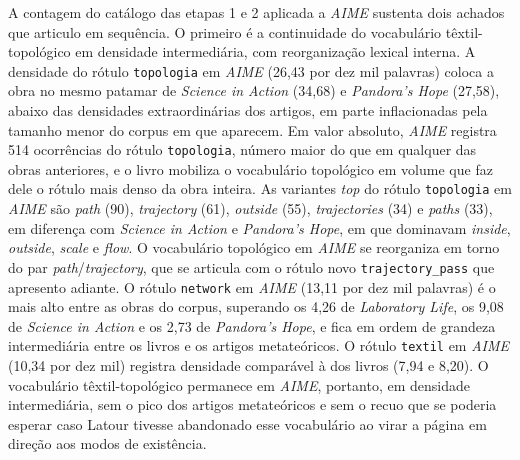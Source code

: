 A contagem do catálogo das etapas 1 e 2 aplicada a \textit{AIME} sustenta dois achados que articulo em sequência. O primeiro é a continuidade do vocabulário têxtil-topológico em densidade intermediária, com reorganização lexical interna. A densidade do rótulo \texttt{topologia} em \textit{AIME} (26,43 por dez mil palavras) coloca a obra no mesmo patamar de \emph{Science in Action} (34,68) e \emph{Pandora's Hope} (27,58), abaixo das densidades extraordinárias dos artigos, em parte inflacionadas pela tamanho menor do corpus em que aparecem. Em valor absoluto, \textit{AIME} registra 514 ocorrências do rótulo \texttt{topologia}, número maior do que em qualquer das obras anteriores, e o livro mobiliza o vocabulário topológico em volume que faz dele o rótulo mais denso da obra inteira. As variantes \emph{top} do rótulo \texttt{topologia} em \textit{AIME} são \emph{path} (90), \emph{trajectory} (61), \emph{outside} (55), \emph{trajectories} (34) e \emph{paths} (33), em diferença com \emph{Science in Action} e \emph{Pandora's Hope}, em que dominavam \emph{inside}, \emph{outside}, \emph{scale} e \emph{flow}. O vocabulário topológico em \textit{AIME} se reorganiza em torno do par \emph{path}/\emph{trajectory}, que se articula com o rótulo novo \texttt{trajectory\_pass} que apresento adiante. O rótulo \texttt{network} em \textit{AIME} (13,11 por dez mil palavras) é o mais alto entre as obras do corpus, superando os 4,26 de \emph{Laboratory Life}, os 9,08 de \emph{Science in Action} e os 2,73 de \emph{Pandora's Hope}, e fica em ordem de grandeza intermediária entre os livros e os artigos metateóricos. O rótulo \texttt{textil} em \textit{AIME} (10,34 por dez mil) registra densidade comparável à dos livros (7,94 e 8,20). O vocabulário têxtil-topológico permanece em \textit{AIME}, portanto, em densidade intermediária, sem o pico dos artigos metateóricos e sem o recuo que se poderia esperar caso Latour tivesse abandonado esse vocabulário ao virar a página em direção aos modos de existência.

